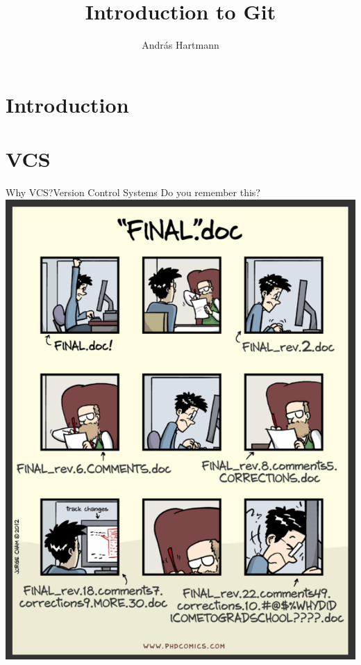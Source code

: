 \documentclass{beamer}
\title{Introduction to Git}
\subtitle{}
\author{Andr\'as Hartmann}
\institute[LCSB]{
LCSB, Computational Biology group
  University of Luxembourg
}
\date{}
\begin{document}
\begin{frame}
  \vspace{2.5em}
  \titlepage
\end{frame}

\section{Introduction}

\section{VCS}
\begin{frame}{Why VCS?}{Version Control Systems}
Do you remember this?\\
\centering
    \includegraphics[height=0.8\textheight]{Finaldoc.png}
\end{frame}
\end{document}
